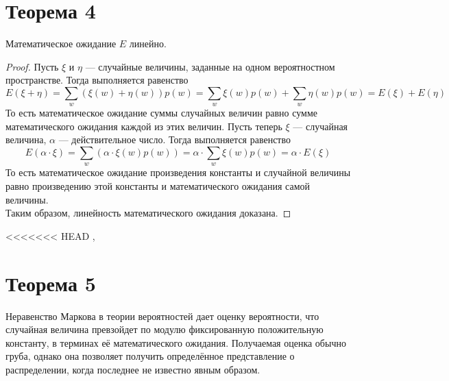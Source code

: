 \documentclass[a4paper,12pt]{article}
\begin{document}
	\section{Теорема 4}
	\begin{theorem}
		Математическое ожидание $E$ линейно.
	\end{theorem}
	\begin{proof}
	Пусть $\xi$ и $\eta$ --- случайные величины, заданные на одном вероятностном пространстве. Тогда выполняется равенство $$E(\xi+\eta)=\sum_w(\xi(w)+\eta(w))p(w)=\sum_w\xi(w)p(w)+\sum_w\eta(w)p(w)=E(\xi)+E(\eta)$$
	То есть математическое ожидание суммы случайных величин равно сумме математического ожидания каждой из этих величин. Пусть теперь $\xi$ --- случайная величина, $\alpha$ --- действительное число. Тогда выполняется равенство 
	$$E(\alpha\cdot\xi)=\sum_w(\alpha\cdot\xi(w)p(w))=\alpha\cdot\sum_w\xi(w)p(w)=\alpha\cdot E(\xi)$$
	То есть математическое ожидание произведения константы и случайной величины равно произведению этой константы и математического ожидания самой величины.\\
	Таким образом, линейность математического ожидания доказана.
	\end{proof}
<<<<<<< HEAD
\sep
    \section {Теорема 5}
   Неравенство Маркова в теории вероятностей дает оценку вероятности, что случайная величина превзойдет по модулю фиксированную положительную константу, в терминах её математического ожидания. Получаемая оценка обычно груба, однако она позволяет получить определённое представление о распределении, когда последнее не известно явным образом.
   
\end{document}
